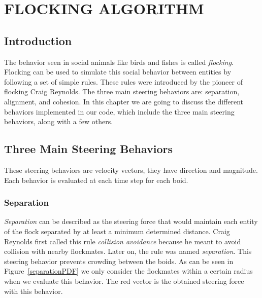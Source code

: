 \chapter{FLOCKING ALGORITHM}

\section{Introduction}
The behavior seen in social animals like birds and fishes is called \textit{flocking}. Flocking can be used to simulate this social behavior between entities by following a set of simple rules. These rules were introduced by the pioneer of flocking Craig Reynolds\cite{craig1}. The three main steering behaviors are: separation, alignment, and cohesion. In this chapter we are going to discuss the different behaviors implemented in our code, which include the three main steering behaviors, along with a few others.

\section{Three Main Steering Behaviors}
These steering behaviors are velocity vectors, they have direction and magnitude. Each behavior is evaluated at each time step for each boid.

\subsection{Separation}
\textit{Separation} can be described as the steering force that would maintain each entity of the flock separated by at least a minimum determined distance. Craig Reynolds first called this rule \textit{collision avoidance} because he meant to avoid collision with nearby flockmates. Later on, the rule was named \textit{separation}. This steering behavior prevents crowding between the boids. As can be seen in Figure~\ref{separationPDF} we only consider the flockmates within a certain radius when we evaluate this behavior. The red vector is the obtained steering force with this behavior.

